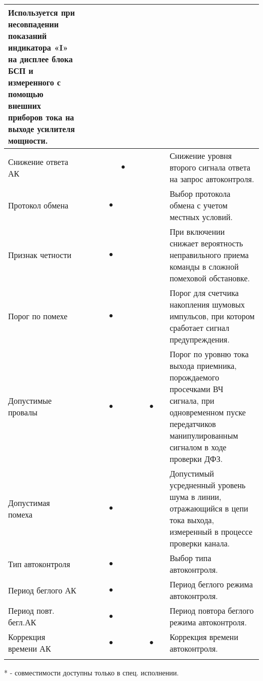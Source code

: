 \begin{tabularx}{\linewidth}{| M{4.6cm} |*{9}{p{0.3cm} |} m{5.8cm} |}
	Используется при несовпадении показаний индикатора «I» на дисплее блока БСП и измеренного с помощью внешних приборов тока на выходе усилителя мощности.  \tabularnewline \hline
	Снижение ответа АК	&   		&   		&   		&   		& $\bullet$ &   		&   		&   		&   		& 
	Снижение уровня второго сигнала ответа на запрос автоконтроля. \tabularnewline \hline
	Протокол обмена		&   		&   		&   		& $\bullet$ &   		&   		&   		&   		&   		& 
	Выбор протокола обмена с учетом местных условий. \tabularnewline \hline
	Признак четности	&   		&   		&  			& $\bullet$ &   		&   		&   		&   		&   		& 
	При включении снижает вероятность неправильного приема команды в сложной помеховой обстановке. \tabularnewline \hline
	Порог по помехе		&   		&   		&   		& $\bullet$ &   		&   		&   		&   		&   		& 
	Порог для счетчика накопления шумовых импульсов, при котором сработает сигнал предупреждения. \tabularnewline \hline
	Допустимые провалы	&   		&   		&   		& $\bullet$ &   		&   		&   		& $\bullet$ &   		& 
	Порог по уровню тока выхода приемника, порождаемого просечками ВЧ сигнала, при одновременном пуске передатчиков манипулированным сигналом в ходе проверки ДФЗ. \tabularnewline \hline
	Допустимая помеха	&   		&   		&   		& $\bullet$ &   		&   		&   		&   		&   		& 
	Допустимый усредненный уровень шума в линии, отражающийся в цепи тока выхода, измеренный в процессе проверки канала. \tabularnewline \hline
	Тип автоконтроля	&   		&   		&   		& $\bullet$ &   		&   		&   		&   		&   		& 
	Выбор типа автоконтроля. \tabularnewline \hline
	Период беглого АК	&   		&   		&   		& $\bullet$ &   		&   		&   		&   		&   		& 
	Период беглого режима автоконтроля. \tabularnewline \hline
	Период повт. бегл.АК &   		&   		&   		& $\bullet$ &   		&   		&   		&   		&   		& 
	Период повтора беглого режима автоконтроля. \tabularnewline \hline
	Коррекция времени АК &   		&   		&   		& $\bullet$ &   		&   		&   		& $\bullet$ &           & 
	Коррекция времени автоконтроля. \tabularnewline 
	
    \lasthline
\end{tabularx} 

* - совместимости доступны только в спец. исполнении.
